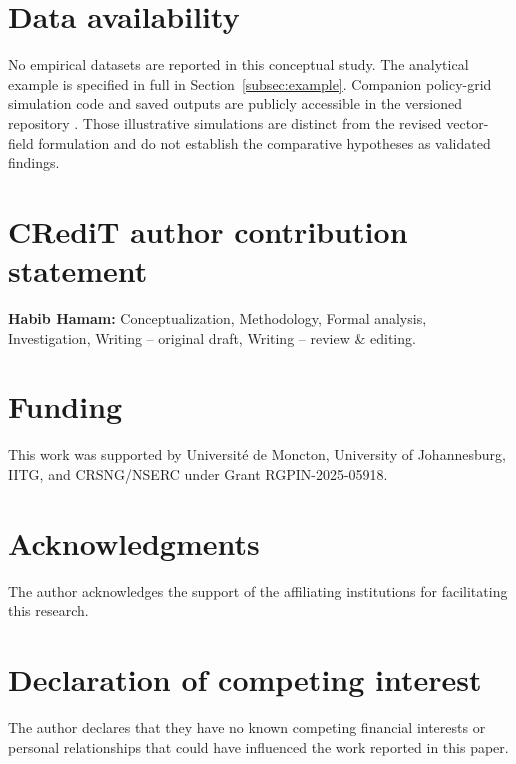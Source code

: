\documentclass[review,12pt]{elsarticle}
\begin{document}
\begin{frontmatter}


\begin{abstract}

\end{abstract}

\end{frontmatter}
\linenumbers












\section*{Data availability}
No empirical datasets are reported in this conceptual study. The analytical example is specified in full in Section~\ref{subsec:example}. Companion policy-grid simulation code and saved outputs are publicly accessible in the versioned repository \citep{Hamam2026GitHub}. Those illustrative simulations are distinct from the revised vector-field formulation and do not establish the comparative hypotheses as validated findings.
\section*{CRediT author contribution statement}
\textbf{Habib Hamam:} Conceptualization, Methodology, Formal analysis, Investigation, Writing -- original draft, Writing -- review \& editing.
\section*{Funding}
This work was supported by Universit\'e de Moncton, University of Johannesburg, IITG, and CRSNG/NSERC under Grant RGPIN-2025-05918.
\section*{Acknowledgments}
The author acknowledges the support of the affiliating institutions for facilitating this research.
\section*{Declaration of competing interest}
The author declares that they have no known competing financial interests or personal relationships that could have influenced the work reported in this paper.
\end{document}
